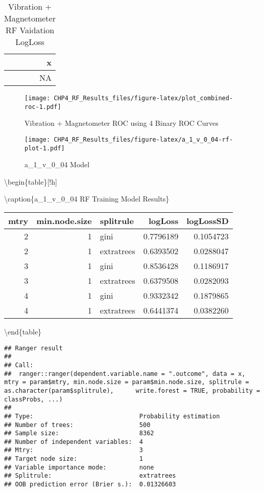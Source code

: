\documentclass[]{article}
\begin{document}
\begin{table}[!h]

\caption{\label{tab:combined-rf-results}Vibration + Magnetometer RF Vaidation LogLoss}
\centering
\begin{tabular}[t]{r}
\toprule
x\\
\midrule
NA\\
\bottomrule
\end{tabular}
\end{table}

\begin{figure}
\centering
\texttt{[image: CHP4\_RF\_Results\_files/figure-latex/plot\_combined-roc-1.pdf]}
\caption{Vibration + Magnetometer ROC using 4 Binary ROC Curves}
\end{figure}

\begin{figure}
\centering
\texttt{[image: CHP4\_RF\_Results\_files/figure-latex/a\_1\_v\_0\_04-rf-plot-1.pdf]}
\caption{a\_1\_v\_0\_04 Model}
\end{figure}

\textbackslash{}begin\{table\}{[}!h{]}

\textbackslash{}caption\{\label{tab:a_1_v_0_04-rf-params}a\_1\_v\_0\_04
RF Training Model Results\} \centering

\begin{tabular}[t]{rrlrr}
\toprule
mtry & min.node.size & splitrule & logLoss & logLossSD\\
\midrule
2 & 1 & gini & 0.7796189 & 0.1054723\\
2 & 1 & extratrees & 0.6393502 & 0.0288047\\
3 & 1 & gini & 0.8536428 & 0.1186917\\
3 & 1 & extratrees & 0.6379508 & 0.0282093\\
4 & 1 & gini & 0.9332342 & 0.1879865\\
4 & 1 & extratrees & 0.6441374 & 0.0382260\\
\bottomrule
\end{tabular}

\textbackslash{}end\{table\}

\begin{verbatim}
## Ranger result
## 
## Call:
##  ranger::ranger(dependent.variable.name = ".outcome", data = x,      mtry = param$mtry, min.node.size = param$min.node.size, splitrule = as.character(param$splitrule),      write.forest = TRUE, probability = classProbs, ...) 
## 
## Type:                             Probability estimation 
## Number of trees:                  500 
## Sample size:                      8362 
## Number of independent variables:  4 
## Mtry:                             3 
## Target node size:                 1 
## Variable importance mode:         none 
## Splitrule:                        extratrees 
## OOB prediction error (Brier s.):  0.01326603
\end{verbatim}
\end{document}
